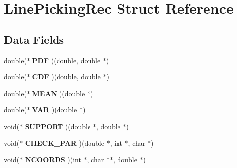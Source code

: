\hypertarget{struct_line_picking_rec}{\section{Line\-Picking\-Rec Struct Reference}
\label{struct_line_picking_rec}
}
\subsection*{Data Fields}
\begin{DoxyCompactItemize}
\item 
\hypertarget{struct_line_picking_rec_ae771b5624dc57ea73c6d5059f02251f5}{double($\ast$ {\bfseries P\-D\-F} )(double, double $\ast$)}\label{struct_line_picking_rec_ae771b5624dc57ea73c6d5059f02251f5}

\item 
\hypertarget{struct_line_picking_rec_a35f0d15618ffe567bcc326a076bb8c72}{double($\ast$ {\bfseries C\-D\-F} )(double, double $\ast$)}\label{struct_line_picking_rec_a35f0d15618ffe567bcc326a076bb8c72}

\item 
\hypertarget{struct_line_picking_rec_a31998c790987df0319a5cec680a2f2ae}{double($\ast$ {\bfseries M\-E\-A\-N} )(double $\ast$)}\label{struct_line_picking_rec_a31998c790987df0319a5cec680a2f2ae}

\item 
\hypertarget{struct_line_picking_rec_ad0b3c8bc8be454fcba65a153181e5dee}{double($\ast$ {\bfseries V\-A\-R} )(double $\ast$)}\label{struct_line_picking_rec_ad0b3c8bc8be454fcba65a153181e5dee}

\item 
\hypertarget{struct_line_picking_rec_a800220d7d26db4a7c3dfd083a1f1f9ab}{void($\ast$ {\bfseries S\-U\-P\-P\-O\-R\-T} )(double $\ast$, double $\ast$)}\label{struct_line_picking_rec_a800220d7d26db4a7c3dfd083a1f1f9ab}

\item 
\hypertarget{struct_line_picking_rec_a9ae62d7891ffd81baf6c300e07f70f3b}{void($\ast$ {\bfseries C\-H\-E\-C\-K\-\_\-\-P\-A\-R} )(double $\ast$, int $\ast$, char $\ast$)}\label{struct_line_picking_rec_a9ae62d7891ffd81baf6c300e07f70f3b}

\item 
\hypertarget{struct_line_picking_rec_a92d946677149fbf8c9e88a47d494c0ce}{void($\ast$ {\bfseries N\-C\-O\-O\-R\-D\-S} )(int $\ast$, char $\ast$$\ast$, double $\ast$)}\label{struct_line_picking_rec_a92d946677149fbf8c9e88a47d494c0ce}


\end{DoxyCompactItemize}
